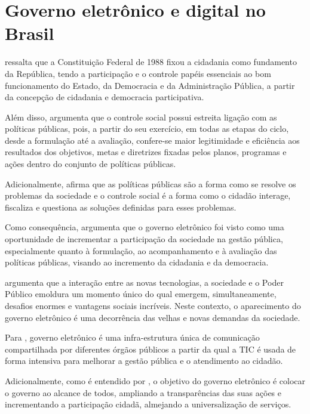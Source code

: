 \chapter{Governo eletrônico e digital no Brasil}

\cite{tavares2022governo} ressalta que a Constituição Federal de 1988 fixou a cidadania como fundamento da República, tendo a participação e o controle papéis essenciais ao bom funcionamento do Estado, da Democracia e da Administração Pública, a partir da concepção de cidadania e democracia participativa.

Além disso, \cite{tavares2022governo} argumenta que o controle social possui estreita ligação com as políticas públicas, pois, a partir do seu exercício, em todas as etapas do ciclo, desde a formulação até a avaliação, confere-se maior legitimidade e eficiência aos resultados dos objetivos, metas e diretrizes fixadas pelos planos, programas e ações dentro do conjunto de políticas públicas.

Adicionalmente, \cite{tavares2022governo} afirma que as políticas públicas são a forma como se resolve os problemas da sociedade e o controle social é a forma como o cidadão interage, fiscaliza e questiona as soluções definidas para esses problemas. 

Como consequência, \cite{Guimaraes2005} argumenta que o governo eletrônico foi visto como uma oportunidade de incrementar a participação da sociedade na gestão pública, especialmente quanto à formulação, ao acompanhamento e à avaliação das políticas públicas, visando ao incremento da cidadania e da democracia. 

\cite{rover2009introduccao} argumenta que a interação entre as novas tecnologias, a sociedade e o Poder Público emoldura um momento único do qual emergem, simultaneamente, desafios enormes e vantagens sociais incríveis. Neste contexto, o aparecimento do governo eletrônico é uma decorrência das velhas e novas demandas da sociedade.

Para \cite{rover2009introduccao}, governo eletrônico é uma infra-estrutura única de comunicação compartilhada por diferentes órgãos públicos a partir da qual a TIC é usada de forma intensiva para melhorar a gestão pública e o atendimento ao cidadão.

Adicionalmente, como é entendido por \cite{rover2009introduccao}, o objetivo do governo eletrônico é colocar o governo ao alcance de todos, ampliando a transparências das suas ações e incrementando a participação cidadã, almejando a universalização de serviços.

